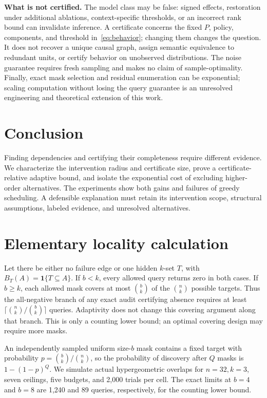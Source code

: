 \documentclass[10pt]{article}
\theoremstyle{definition}\newtheorem{definition}[theorem]{Definition}
\newcommand{\ind}{\mathbf 1}
\begin{document}
\textbf{What is not certified.} The model class may be false: signed effects,
restoration under additional ablations, context-specific thresholds, or an incorrect
rank bound can invalidate inference. A certificate concerns the fixed $P$, policy,
components, and threshold in~\eqref{eq:behavior}; changing them changes the question.
It does not recover a unique causal graph, assign semantic equivalence to redundant
units, or certify behavior on unobserved distributions. The noise guarantee requires
fresh sampling and makes no claim of sample-optimality. Finally, exact mask selection
and residual enumeration can be exponential; scaling computation without losing the
query guarantee is an unresolved engineering and theoretical extension of this work.

\section{Conclusion}
Finding dependencies and certifying their completeness require different evidence.
We characterize the intervention radius and certificate size, prove a
certificate-relative adaptive bound, and isolate the exponential cost of excluding
higher-order alternatives. The experiments show both gains and failures of greedy
scheduling. A defensible explanation must retain its intervention scope,
structural assumptions, labeled evidence, and unresolved alternatives.



\appendix
\section{Elementary locality calculation}\label{app:locality}
Let there be either no failure edge or one hidden $k$-set $T$, with
$B_T(A)=\ind\{T\subseteq A\}$. If $b<k$, every allowed query returns zero in both
cases. If $b\ge k$, each allowed mask covers at most $\binom bk$ of the $\binom nk$
possible targets. Thus the all-negative branch of any exact audit certifying absence
requires at least $\lceil\binom nk/\binom bk\rceil$ queries. Adaptivity does not
change this covering argument along that branch. This is only a counting lower
bound; an optimal covering design may require more masks.

An independently sampled uniform size-$b$ mask contains a fixed target with
probability $p=\binom bk/\binom nk$, so the probability of discovery after $Q$ masks
is $1-(1-p)^Q$. We simulate actual hypergeometric overlaps for $n=32,k=3$, seven
ceilings, five budgets, and 2,000 trials per cell. The exact limits at $b=4$ and $b=8$
are 1,240 and 89 queries, respectively, for the counting lower bound.
\end{document}
